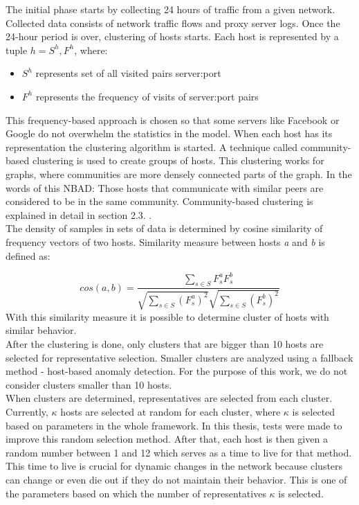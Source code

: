 \documentclass[thesis=B,english]{FITthesis}[2012/10/20]
\def\cbl{\color{blue}} %
\begin{document}
The initial phase starts by collecting 24 hours of traffic from a given network.
Collected data consists of network traffic flows and proxy server logs.
Once the 24-hour period is over, clustering of hosts starts.
Each host is represented by a tuple $h = {S^h, F^h}$, where:
\begin{itemize}
    \item $S^h$ represents set of all visited pairs server:port
    \item $F^h$ represents the frequency of visits of server:port pairs
\end{itemize}
This frequency-based approach is chosen so that some servers like Facebook or Google do not overwhelm the statistics in the model.
When each host has its representation the clustering algorithm is started.
A technique called community-based clustering is used to create groups of hosts.
This clustering works for graphs, where communities are more densely connected parts of the graph.
In the words of this NBAD: Those hosts that communicate with similar peers are considered to be in the same community.
Community-based clustering is explained in detail in section 2.3. . \\

The density of samples in sets of data is determined by cosine similarity of frequency vectors of two hosts.
Similarity measure between hosts \textit{a} and \textit{b} is defined as:

{\cbl
\[
cos(a, b) = \frac{\sum\limits_{s \in S} F_s^a F_s^b} {\sqrt{\sum\limits_{s \in S} (F_s^a)^2} \sqrt{\sum\limits_{s \in S} (F_s^b)^2}}
\]
}%
%
With this similarity measure it is possible to determine cluster of hosts with similar behavior.
\\

After the clustering is done, only clusters that are bigger than 10 hosts are selected for representative selection.
Smaller clusters are analyzed using a fallback method - host-based anomaly detection.
For the purpose of this work, we do not consider clusters smaller than 10 hosts. \\

When clusters are determined, representatives are selected from each cluster.
Currently, $\kappa$ hosts are selected at random for each cluster, where $\kappa$ is selected based on parameters in the whole framework.
In this thesis, tests were made to improve this random selection method.
After that, each host is then given a random number between 1 and 12 which serves as a time to live for that method.
This time to live is crucial for dynamic changes in the network because clusters can change or even die out if they do not maintain their behavior.
This is one of the parameters based on which the number of representatives $\kappa$ is selected. \\
\end{document}
